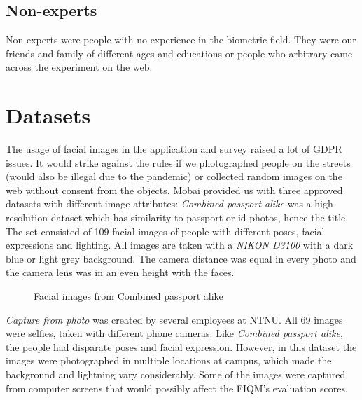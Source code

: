 \subsection*{Non-experts}
Non-experts were people with no experience in the biometric field. They were our friends and family of different ages and educations or people who arbitrary came across the experiment on the web. 

\section{Datasets}
\label{sec:datasets}
The usage of facial images in the application and survey raised a lot of GDPR issues. It would strike against the rules if we photographed people on the streets (would also be illegal due to the pandemic) or collected random images on the web without consent from the objects. Mobai provided us with three approved datasets with different image attributes: \textit{Combined passport alike} was a high resolution dataset which has similarity to passport or id photos, hence the title. The set consisted of 109 facial images of people with different poses, facial expressions and lighting. All images are taken with a \textit{NIKON D3100} with a dark blue or light grey background. The camera distance was equal in every photo and the camera lens was in an even height with the faces. 
\begin{figure}[h]
    \centering
    \qquad
    \caption{Facial images from Combined passport alike}
    \label{fig:combined_passport_alike}
\end{figure}
% 
\textit{Capture from photo} was created by several employees at NTNU. All 69 images were selfies, taken with different phone cameras. Like \textit{Combined passport alike}, the people had disparate poses and facial expression. However, in this dataset the images were photographed in multiple locations at campus, which made the background and lightning vary considerably. Some of the images were captured from computer screens that would possibly affect the FIQM's evaluation scores. \newpage
